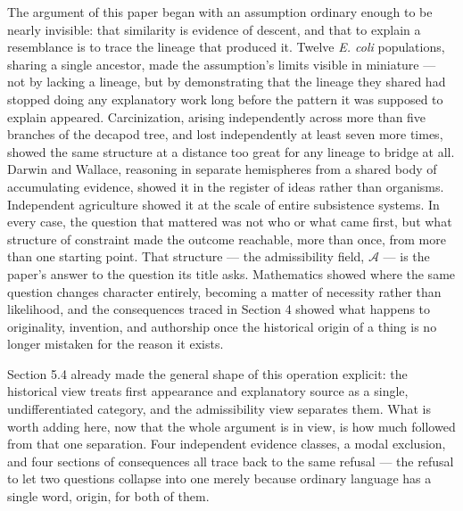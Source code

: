 \documentclass[11pt]{article}
\theoremstyle{plain}
\begin{document}
The argument of this paper began with an assumption ordinary enough to be nearly invisible: that similarity is evidence of descent, and that to explain a resemblance is to trace the lineage that produced it. Twelve \emph{E. coli} populations, sharing a single ancestor, made the assumption's limits visible in miniature --- not by lacking a lineage, but by demonstrating that the lineage they shared had stopped doing any explanatory work long before the pattern it was supposed to explain appeared. Carcinization, arising independently across more than five branches of the decapod tree, and lost independently at least seven more times, showed the same structure at a distance too great for any lineage to bridge at all. Darwin and Wallace, reasoning in separate hemispheres from a shared body of accumulating evidence, showed it in the register of ideas rather than organisms. Independent agriculture showed it at the scale of entire subsistence systems. In every case, the question that mattered was not who or what came first, but what structure of constraint made the outcome reachable, more than once, from more than one starting point. That structure --- the admissibility field, \(\mathcal{A}\) --- is the paper's answer to the question its title asks. Mathematics showed where the same question changes character entirely, becoming a matter of necessity rather than likelihood, and the consequences traced in Section 4 showed what happens to originality, invention, and authorship once the historical origin of a thing is no longer mistaken for the reason it exists.

Section 5.4 already made the general shape of this operation explicit: the historical view treats first appearance and explanatory source as a single, undifferentiated category, and the admissibility view separates them. What is worth adding here, now that the whole argument is in view, is how much followed from that one separation. Four independent evidence classes, a modal exclusion, and four sections of consequences all trace back to the same refusal --- the refusal to let two questions collapse into one merely because ordinary language has a single word, origin, for both of them.
\end{document}
